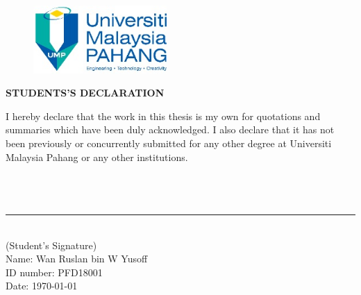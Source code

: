 \thispagestyle{empty}

\begin{figure}[h]
\begin{center}
	\includegraphics[width=12pc]{Image0/UMPLogo.jpg}
\end{center}
\end{figure}

\begin{center}
	\textbf{STUDENTS'S DECLARATION}\\
\end{center}

\begin{onehalfspacing}
\noindent
I hereby declare that the work in this thesis is my own for quotations and summaries which have been duly acknowledged. I also declare that it has not been previously or concurrently submitted for any other degree at Universiti Malaysia Pahang or any other institutions.
\\
\\
\\
\\
\noindent\rule{5cm}{0.4pt}\\
(Student's Signature)\\
Name: Wan Ruslan bin W Yusoff\\
ID number: PFD18001\\
Date: \today \\
\end{onehalfspacing}
